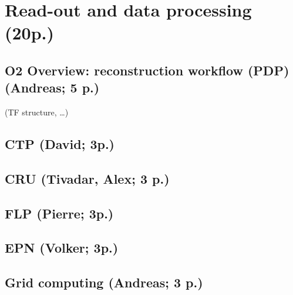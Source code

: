 \section{Read-out and data processing (20p.)}
\subsection{O2 Overview: reconstruction workflow (PDP) (Andreas; 5 p.)}
(TF structure, …)
\subsection{CTP (David; 3p.)}
\subsection{CRU (Tivadar, Alex; 3 p.)}
\subsection{FLP (Pierre; 3p.)}

\subsection{EPN (Volker; 3p.)}
\subsection{Grid computing (Andreas; 3 p.)}
